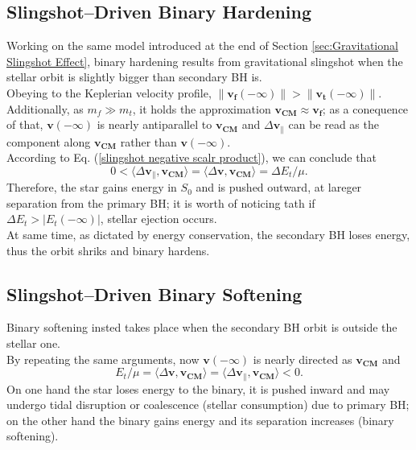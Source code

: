 \subsection{Slingshot–Driven Binary Hardening}\label{sec:Slingshot–Driven Binary Hardening}
 Working on the same model introduced at the end of Section \ref{sec:Gravitational Slingshot Effect}, binary hardening results from gravitational slingshot when the stellar orbit is slightly bigger than secondary BH is.\\Obeying to the Keplerian velocity profile, $\|\mathbf{v_f}(-\infty) \|> \|\mathbf{v_t}(-\infty) \|$. Additionally, as $m_f\gg m_t$, it holds the approximation $\mathbf{v_{CM}}\approx \mathbf{v_f}$; as a conequence of that, $\mathbf{v}(-\infty)$ is nearly antiparallel to $\mathbf{v_{CM}}$ and $\Delta\mathbf{v}_\parallel$ can be read as the component along $\mathbf{v_{CM}}$ rather than $\mathbf{v}(-\infty)$.\\According to Eq. (\ref{slingshot negative scalr product}), we can conclude that
\begin{equation}
    0<\langle \Delta\mathbf{v}_\parallel, \mathbf{v_{CM}} \rangle=\langle \Delta\mathbf{v}, \mathbf{v_{CM}}\rangle=\Delta E_t/\mu.
\end{equation}
Therefore, the star gains energy in $S_0$ and is pushed outward, at lareger separation from the primary BH; it is worth of noticing tath if $\Delta E_t>|E_t(-\infty)|$, stellar ejection occurs.\\At same time, as dictated by energy conservation, the secondary BH loses energy, thus the orbit shriks and  binary hardens\cite{Ciotti_2021}.
\subsection{Slingshot–Driven Binary Softening}
Binary softening insted takes place when the secondary BH orbit is outside the stellar one.\\By repeating the same arguments, now $\mathbf{v}(-\infty)$ is nearly directed as $\mathbf{v_{CM}}$ and
\begin{equation}
     E_t/\mu=\langle \Delta\mathbf{v}, \mathbf{v_{CM}}\rangle=\langle \Delta\mathbf{v}_\parallel, \mathbf{v_{CM}} \rangle<0.
\end{equation}
On one hand the star loses energy to the binary, it is pushed inward and may undergo tidal disruption or coalescence (stellar consumption) due to primary BH; on the other hand the binary gains energy and its separation increases (binary softening).



